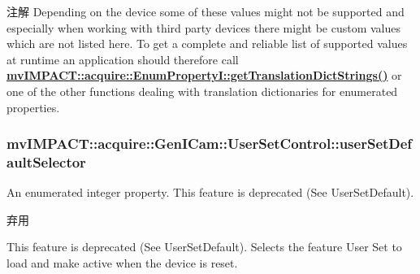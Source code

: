 \begin{DoxyNote}{注解}
Depending on the device some of these values might not be supported and especially when working with third party devices there might be custom values which are not listed here. To get a complete and reliable list of supported values at runtime an application should therefore call {\bfseries \hyperlink{classmv_i_m_p_a_c_t_1_1acquire_1_1_enum_property_i_a0ba6ccbf5ee69784d5d0b537924d26b6}{mv\+I\+M\+P\+A\+C\+T\+::acquire\+::\+Enum\+Property\+I\+::get\+Translation\+Dict\+Strings()}} or one of the other functions dealing with translation dictionaries for enumerated properties. 
\end{DoxyNote}
\hypertarget{classmv_i_m_p_a_c_t_1_1acquire_1_1_gen_i_cam_1_1_user_set_control_a08d0aaa8f50249724bf888794adf1713}{
\subsubsection[{user\+Set\+Default\+Selector}]{ mv\+I\+M\+P\+A\+C\+T\+::acquire\+::\+Gen\+I\+Cam\+::\+User\+Set\+Control\+::user\+Set\+Default\+Selector}}\label{classmv_i_m_p_a_c_t_1_1acquire_1_1_gen_i_cam_1_1_user_set_control_a08d0aaa8f50249724bf888794adf1713}


An enumerated integer property. This feature is deprecated (See User\+Set\+Default). 

\begin{DoxyRefDesc}{弃用}
\item[\hyperlink{deprecated__deprecated000054}{弃用}]This feature is deprecated (See User\+Set\+Default). Selects the feature User Set to load and make active when the device is reset.\end{DoxyRefDesc}


